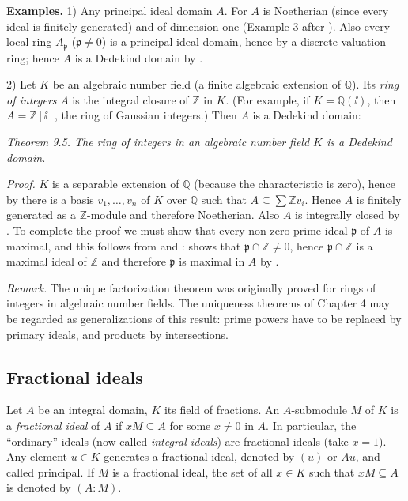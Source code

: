 
\noindent\textbf{Examples.} 1) Any principal ideal domain $A$. For $A$ is Noetherian (since every ideal is finitely generated) and of dimension one (Example 3 after ). Also every local ring $A_{\mathfrak p}$ ($\mathfrak p\neq0$) is a principal ideal domain, hence by  a discrete valuation ring; hence $A$ is a Dedekind domain by .

2) Let $K$ be an algebraic number field (a finite algebraic extension of $\mathbb Q$). Its \textit{ring of integers} $A$ is the integral closure of $\mathbb Z$ in $K$. (For example, if $K=\mathbb Q(\ii)$, then $A=\mathbb Z[\ii]$, the ring of Gaussian integers.) Then $A$ is a Dedekind domain:

\noindent\textit{Theorem 9.5. The ring of integers in an algebraic number field $K$ is a Dedekind domain.}

\noindent\textit{Proof.} $K$ is a separable extension of $\mathbb Q$ (because the characteristic is zero), hence by  there is a basis $v_1,\ldots,v_n$ of $K$ over $\mathbb Q$ such that $A\subseteq\sum\mathbb Zv_i$. Hence $A$ is finitely generated as a $\mathbb Z$-module and therefore Noetherian. Also $A$ is integrally closed by . To complete the proof we must show that every non-zero prime ideal $\mathfrak p$ of $A$ is maximal, and this follows from  and :  shows that $\mathfrak p\cap\mathbb Z\neq0$, hence $\mathfrak p\cap\mathbb Z$ is a maximal ideal of $\mathbb Z$ and therefore $\mathfrak p$ is maximal in $A$ by . \proofbox

\noindent\textit{Remark.} The unique factorization theorem  was originally proved for rings of integers in algebraic number fields. The uniqueness theorems of Chapter 4 may be regarded as generalizations of this result: prime powers have to be replaced by primary ideals, and products by intersections.

\subsection{Fractional ideals}

Let $A$ be an integral domain, $K$ its field of fractions. An $A$-submodule $M$ of $K$ is a \textit{fractional ideal} of $A$ if $xM\subseteq A$ for some $x\neq0$ in $A$. In particular, the ``ordinary'' ideals (now called \textit{integral ideals}) are fractional ideals (take $x=1$). Any element $u\in K$ generates a fractional ideal, denoted by $(u)$ or $Au$, and called principal. If $M$ is a fractional ideal, the set of all $x\in K$ such that $xM\subseteq A$ is denoted by $(A:M)$.

